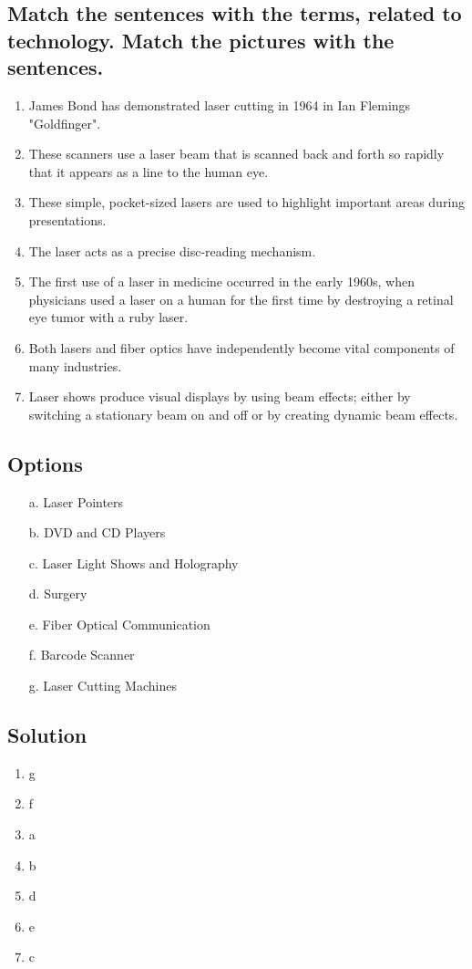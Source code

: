 \subsection*{Match the sentences with the terms, related to technology. Match the pictures with the
      sentences.}
\begin{enumerate}
      \item James Bond has demonstrated laser cutting in 1964 in Ian Flemings "Goldfinger".
      \item These scanners use a laser beam that is scanned back and forth so rapidly that it appears as a line to the human eye.
      \item These simple, pocket-sized lasers are used to highlight important areas during presentations.
      \item The laser acts as a precise disc-reading mechanism.
      \item The first use of a laser in medicine occurred in the early 1960s, when physicians used a laser on a human for the first time by destroying a retinal eye tumor with a ruby laser.
      \item Both lasers and fiber optics have independently become vital components of many industries.
      \item Laser shows produce visual displays by using beam effects; either by switching a stationary beam on and off or by creating dynamic beam effects.
\end{enumerate}

\subsection*{Options}
\begin{enumerate}
      \item[a.] Laser Pointers
      \item[b.] DVD and CD Players
      \item[c.] Laser Light Shows and Holography
      \item[d.] Surgery
      \item[e.] Fiber Optical Communication
      \item[f.] Barcode Scanner
      \item[g.] Laser Cutting Machines
\end{enumerate}

\subsection*{Solution}
\begin{enumerate}
      \item g
      \item f
      \item a
      \item b
      \item d
      \item e
      \item c
\end{enumerate}

